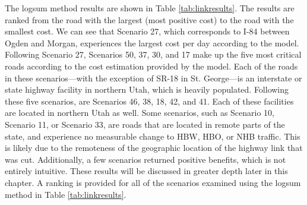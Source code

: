 The logsum method results are shown in Table \ref{tab:linkresults}.
The results are ranked from the road with the largest (most positive
cost) to the road with the smallest cost. We can see that Scenario 27, which
corresponds to I-84 between Ogden and Morgan, experiences the largest cost
per day according to the model. Following Scenario 27, Scenarios 50, 37, 30,
and 17 make up the five most critical roads according to the cost estimation
provided by the model. Each of the roads in these scenarios---with the exception
of SR-18 in St. George---is an interstate or state highway facility in
northern Utah, which is heavily populated. Following these five scenarios, are
Scenarios 46, 38, 18, 42, and 41. Each of these facilities are located in northern Utah as well.
Some scenarios, such as Scenario 10,
Scenario 11, or Scenario 33, are roads that are located in remote parts of the state, and
experience no measurable change to HBW, HBO, or NHB traffic. This is
likely due to the remoteness of the geographic location of the highway
link that was cut. Additionally, a few scenarios returned positive benefits, which is not entirely intuitive. These results will be discussed in greater depth later in this chapter. A ranking is provided for all of the scenarios examined
using the logsum method in Table \ref{tab:linkresults}.

